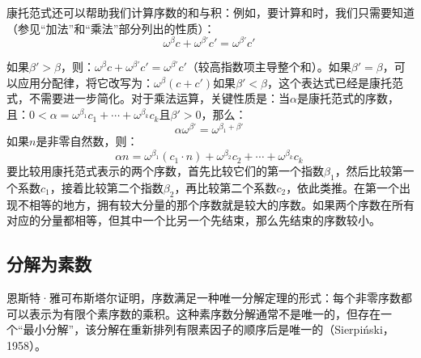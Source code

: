 康托范式还可以帮助我们计算序数的和与积：例如，要计算和时，我们只需要知道（参见“加法”和“乘法”部分列出的性质）：  
\[
\omega^\beta c + \omega^{\beta'} c' = \omega^{\beta'} c'~
\]

如果\(\beta' > \beta\)，则：\(\omega^\beta c + \omega^{\beta'} c' = \omega^{\beta'} c'\)（较高指数项主导整个和）。如果\(\beta' = \beta\)，可以应用分配律，将它改写为：\(\omega^\beta (c + c')\)如果\(\beta' < \beta\)，这个表达式已经是康托范式，不需要进一步简化。对于乘法运算，关键性质是：当\(\alpha\)是康托范式的序数，且：\(0 < \alpha = \omega^{\beta_1}c_1 + \cdots + \omega^{\beta_k}c_k\)且\(\beta' > 0\)，那么：
\[
\alpha\omega^{\beta'} = \omega^{\beta_1 + \beta'}~
\]
如果\(n\)是非零自然数，则：
\[
\alpha n = \omega^{\beta_1}(c_1 \cdot n) + \omega^{\beta_2}c_2 + \cdots + \omega^{\beta_k}c_k~
\]
要比较用康托范式表示的两个序数，首先比较它们的第一个指数\(\beta_1\)，然后比较第一个系数\(c_1\)，接着比较第二个指数\(\beta_2\)，再比较第二个系数\(c_2\)，依此类推。在第一个出现不相等的地方，拥有较大分量的那个序数就是较大的序数。如果两个序数在所有对应的分量都相等，但其中一个比另一个先结束，那么先结束的序数较小。
\subsection{分解为素数} 
恩斯特·雅可布斯塔尔证明，序数满足一种唯一分解定理的形式：每个非零序数都可以表示为有限个素序数的乘积。这种素序数分解通常不是唯一的，但存在一个“最小分解”，该分解在重新排列有限素因子的顺序后是唯一的（Sierpiński，1958）。


